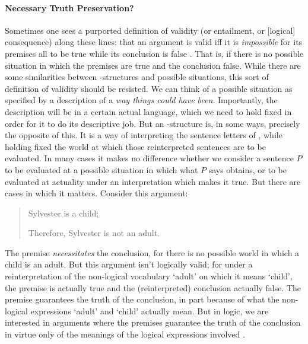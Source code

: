  \paragraph{Necessary Truth Preservation?} Sometimes one sees a purported definition of validity (or entailment, or [logical] consequence) along these lines: that an argument is valid iff it is \emph{impossible} for its premises all to be true while its conclusion is false \citep[19]{sweetreas}. That is, if there is no possible situation in which the premises are true and the conclusion false. While there are some similarities between \lone-structures and possible situations, this sort of definition of validity should be resisted. We can think of a possible situation as specified by a description of a \emph{way things could have been}. Importantly, the description will be in a certain actual language, which we need to hold fixed in order for it to do its descriptive job. But an \lone-structure is, in some ways, precisely the opposite of this. It is a way of interpreting the sentence letters of \lone, while holding fixed the world at which those reinterpreted sentences are to be evaluated. In many cases it makes no difference whether we consider a sentence $P$ to be evaluated at a possible situation in which what $P$ says obtains, or to be evaluated at actuality under an interpretation which makes it true. But there are cases in which it matters. Consider this argument: \begin{quotation}
	Sylvester is a child;

	Therefore, Sylvester is not an adult.
\end{quotation}
The premise \emph{necessitates} the conclusion, for there is no possible world in which a child is an adult. But this argument isn't logically valid; for under a reinterpretation of the non-logical vocabulary ‘adult’ on which it means ‘child’, the premise is actually true and the (reinterpreted) conclusion actually false. The premise guarantees the truth of the conclusion, in part because of what the non-logical expressions ‘adult’ and ‘child’ actually mean. But in logic, we are interested in arguments where the premises guarantee the truth of the conclusion in virtue only of the meanings of the logical expressions involved \citep{tarski}.

